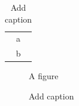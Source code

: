 \documentclass[10pt]{beamer}
\begin{document}
\begin{frame}
\begin{table}
\caption{Add caption}
\begin{tabular}{c}
a \\
b \\
\end{tabular}
\end{table}
\end{frame}

\begin{frame}
\begin{figure}
A figure
\caption{Add caption}
\end{figure}
\end{frame}
\end{document}
